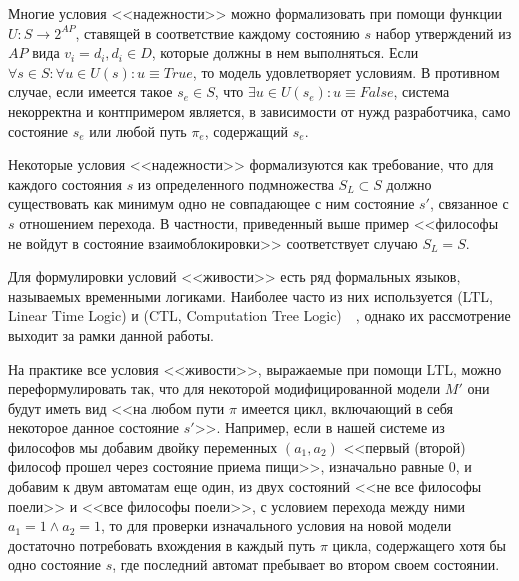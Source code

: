 Многие условия <<надежности>> можно формализовать при помощи функции $U: S \rightarrow
2^{AP}$, ставящей в соответствие каждому состоянию $s$ набор утверждений из $AP$ вида $v_i
= d_i, d_i \in D$, которые должны в нем выполняться. Если $\forall s \in S:\forall u \in
U(s):u \equiv True$, то модель удовлетворяет условиям. В противном случае, если имеется
такое $s_e \in S$, что $\exists u \in U(s_e): u \equiv False$, система некорректна и
контпримером является, в зависимости от нужд разработчика, само состояние $s_e$ или любой
путь $\pi_e$, содержащий $s_e$.

Некоторые условия <<надежности>> формализуются как требование, что для каждого состояния
$s$ из определенного подмножества $S_L \subset S$ должно существовать как минимум одно не
совпадающее с ним состояние $s'$, связанное с $s$ отношением перехода. В частности,
приведенный выше пример <<философы не войдут в состояние взаимоблокировки>> соответствует
случаю $S_L = S$.

Для формулировки условий <<живости>> есть ряд формальных языков, называемых временными
логиками. Наиболее часто из них используется  (LTL, Linear
Time Logic) и  (CTL, Computation Tree
Logic)~\cite{Clarke}~\cite{Velder}, однако их рассмотрение выходит за рамки данной
работы.

На практике все условия <<живости>>, выражаемые при помощи LTL, можно переформулировать
так, что для некоторой модифицированной модели $M'$ они будут иметь вид <<на любом пути
$\pi$ имеется цикл, включающий в себя некоторое данное состояние $s'$>>. Например, если в
нашей системе из философов мы добавим двойку переменных $(a_1, a_2)$ <<первый (второй)
философ прошел через состояние приема пищи>>, изначально равные $0$, и добавим к двум
автоматам еще один, из двух состояний <<не все философы поели>> и <<все философы поели>>,
с условием перехода между ними $a_1 = 1 \wedge a_2 = 1$, то для проверки изначального
условия на новой модели достаточно потребовать вхождения в каждый путь $\pi$ цикла,
содержащего хотя бы одно состояние $s$, где последний автомат пребывает во втором своем
состоянии.


